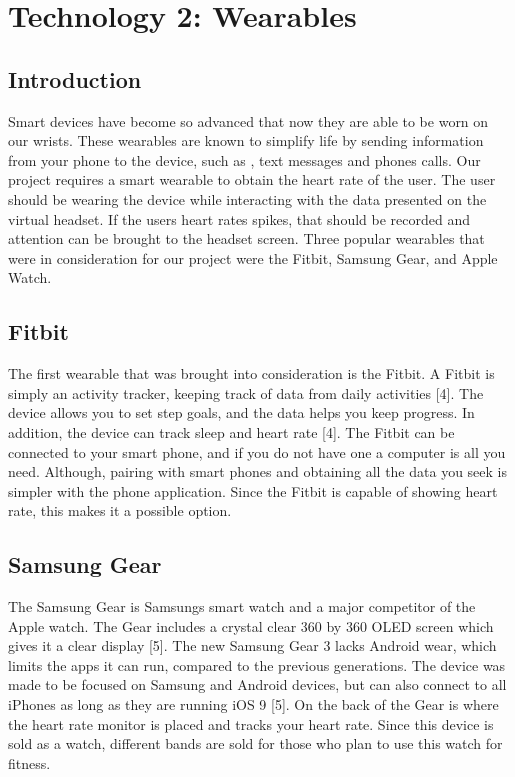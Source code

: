 \documentclass[onecolumn, draftclsnofoot,10pt, compsoc]{IEEEtran}
\begin{document}
\section{Technology 2: Wearables}

	\subsection{Introduction}
	
		Smart devices have become so advanced that now they are able to be worn on our wrists. These wearables are known to simplify life by sending information from your phone to the device, such as , text messages and phones calls. Our project requires a smart wearable to
		obtain the heart rate of the user. The user should be wearing the device while interacting with the data presented on the virtual headset. If the users heart rates spikes, that should be recorded and attention can be brought to the headset screen. Three 
		popular wearables that were in consideration for our project were the Fitbit, Samsung Gear, and Apple Watch.
	
	\subsection{Fitbit}
	
		The first wearable that was brought into consideration is the Fitbit. A Fitbit is simply an activity tracker, keeping track of data from daily activities [4]. The device allows you to set step goals, and the data helps you keep progress. In addition, the 
		device can track sleep and heart rate [4]. The Fitbit can be connected to your smart phone, and if you do not have one a computer is all you need. Although, pairing with smart phones and obtaining all the data you seek is simpler with the phone application. 
		Since the Fitbit is capable of showing heart rate, this makes it a possible option.
		
	\subsection{Samsung Gear}	
	
		The Samsung Gear is Samsungs smart watch and a major competitor of the Apple watch. The Gear includes a crystal clear 360 by 360 OLED screen which gives it a clear display [5]. The new Samsung Gear 3 lacks Android wear, which limits the apps it can run, compared 
		to the previous generations. The device was made to be focused on Samsung and Android devices, but can also connect to all iPhones as long as they are running iOS 9 [5]. On the back of the Gear is where the heart rate monitor is placed and tracks your
		heart rate. Since this device is sold as a watch, different bands are sold for those who plan to use this watch for fitness.
		
\end{document}
